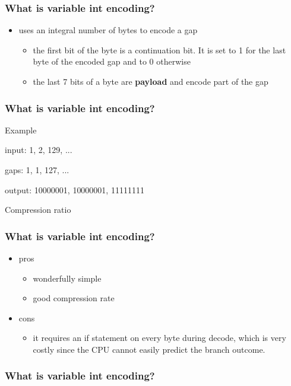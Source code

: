 \documentclass{beamer}
\begin{document}
  	\begin{frame}
  		\frametitle{What is variable int encoding?}
  		\begin{itemize}
  			\item uses an integral number of bytes to encode a gap
  			\begin{itemize}
  				\item the first bit of the byte is a continuation bit. It is set to 1 for the last byte of the encoded gap and to 0 otherwise
  				\item the last 7 bits of a byte are \textbf{payload} and encode part of the gap
  			\end{itemize}
  		\end{itemize}
  	\end{frame}
  	\begin{frame}
  		\frametitle{What is variable int encoding?}
  		Example
  		
  		input:    1, 2, 129, ...
  		
  		gaps:     1, 1, 127, ...
  		
  		output: {\color{red!100}1}0000001, {\color{red!100}1}0000001, {\color{red!100}1}1111111
  		
  		Compression ratio 
  	\end{frame}
  	\begin{frame}
  		\frametitle{What is variable int encoding?}
  		\begin{itemize}
    		    \item pros
    		    \begin{itemize}
    		    		\item wonderfully simple
    		    		\item good compression rate
    		    \end{itemize}
    		    \item cons
    		    \begin{itemize}
    		    		\item it requires an if statement on every byte	during decode, which is very costly since the	 CPU	 cannot easily predict the branch outcome.
    		    \end{itemize}
		\end{itemize}
  	\end{frame}
  	\begin{frame}
  		\frametitle{What is variable int encoding?}
  		
  	\end{frame}
\end{document}

